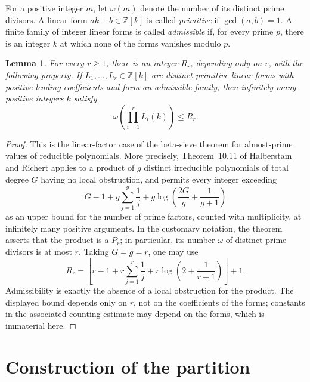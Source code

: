 \documentclass[a4paper,11pt]{amsart}
\newtheorem{lemma}[theorem]{Lemma}
\begin{document}
For a positive integer \(m\), let \(\omega(m)\) denote the number of its distinct prime divisors.
A linear form \(ak+b\in\mathbb Z[k]\) is called \emph{primitive} if \(\gcd(a,b)=1\).
A finite family of integer linear forms is called \emph{admissible} if, for every prime \(p\), there is an integer \(k\) at which none of the forms vanishes modulo \(p\).

\begin{lemma}\label{lem:sieve}
For every \(r\geq 1\), there is an integer \(R_r\), depending only on \(r\), with the following property.
If \(L_1,\ldots,L_r\in\mathbb Z[k]\) are distinct primitive linear forms with positive leading coefficients and form an admissible family, then infinitely many positive integers \(k\) satisfy
\[
\omega\!\left(\prod_{i=1}^r L_i(k)\right)\leq R_r.
\]
\end{lemma}

\begin{proof}
This is the linear-factor case of the beta-sieve theorem for almost-prime values of reducible polynomials.
More precisely, Theorem~10.11 of Halberstam and Richert \cite{HR} applies to a product of \(g\) distinct irreducible polynomials of total degree \(G\) having no local obstruction, and permits every integer exceeding
\[
G-1+g\sum_{j=1}^g\frac1j
   +g\log\!\left(\frac{2G}{g}+\frac1{g+1}\right)
\]
as an upper bound for the number of prime factors, counted with
multiplicity, at infinitely many positive arguments.  In the customary
notation, the theorem asserts that the product is a \(P_r\); in
particular, its number \(\omega\) of distinct prime divisors is at most
\(r\).
Taking \(G=g=r\), one may use
\[
R_r=
\left\lfloor
r-1+r\sum_{j=1}^r\frac1j
+r\log\!\left(2+\frac1{r+1}\right)
\right\rfloor+1.
\]
Admissibility is exactly the absence of a local obstruction for the product.
The displayed bound depends only on \(r\), not on the coefficients of the forms; constants in the associated counting estimate may depend on the forms, which is immaterial here.
\end{proof}

\section{Construction of the partition}
\end{document}
